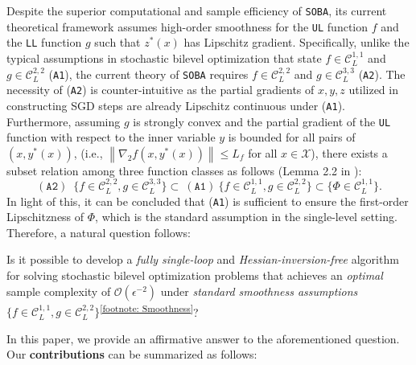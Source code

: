 \documentclass[10pt]{article}
\newcommand{\sref}[1]{\textsuperscript{\ref{#1}}}
\theoremstyle{remark}
\newcommand{\cC}{\mathcal{C}}
\newcommand{\cO}{\mathcal{O}}
\newcommand{\cX}{\mathcal{X}}
\newcommand{\norm}[1]{\left\|#1\right\|}
\begin{document}
Despite the superior computational and sample efficiency of \texttt{SOBA}, its current theoretical framework assumes high-order smoothness for the \texttt{UL} function $f$ and the \texttt{LL} function $g$ such that $z^*(x)$ has Lipschitz gradient. Specifically, unlike the typical assumptions in stochastic bilevel optimization that state $f\in \cC_{L}^{1,1}$ and $g\in \cC_{L}^{2,2}$ (\texttt{A1}), the current theory of \texttt{SOBA} requires $f\in \cC_{L}^{2,2}$ and $g\in \cC_{L}^{3,3}$ (\texttt{A2}). The necessity of (\texttt{A2}) is counter-intuitive as the partial gradients of $x, y, z$ utilized in constructing SGD steps are already Lipschitz continuous under (\texttt{A1}). Furthermore, assuming $g$ is strongly convex and the partial gradient of the \texttt{UL} function with respect to the inner variable $y$ is bounded for all pairs of $(x, y^*(x))$, (i.e., $\norm{\nabla_2 f(x, y^*(x))}\leq L_f$ for all $x\in\cX$), there exists a subset relation among three function classes as follows (Lemma 2.2 in \cite{ghadimi2018approximation}):
\begin{equation*}
   \mathrm{(\texttt{A2})}\,\,\, \{f\in \cC_{L}^{2,2}, g\in \cC_{L}^{3,3}\} \subset \ \mathrm{(\texttt{A1})}\ \{f\in \cC_{L}^{1,1}, g\in \cC_{L}^{2,2}\} \subset \{\Phi\in \cC_{L}^{1,1}\}.
\end{equation*}
In light of this, it can be concluded that (\texttt{A1}) is sufficient to ensure the first-order Lipschitzness of $\Phi$, which is the standard assumption in the single-level setting. Therefore, a natural question follows:
\begin{questionbox}
    \centering
    Is it possible to develop a \emph{fully single-loop} and \emph{Hessian-inversion-free} algorithm for solving stochastic bilevel optimization problems that achieves an \emph{optimal} sample complexity of $\cO(\epsilon^{-2})$ under \emph{standard smoothness assumptions} $\{f\in \cC_{L}^{1,1}, g\in \cC_{L}^{2,2}\}$\sref{footnote: Smoothness}?
\end{questionbox}
In this paper, we provide an affirmative answer to the aforementioned question. Our \textbf{contributions} can be summarized as follows:
\end{document}
